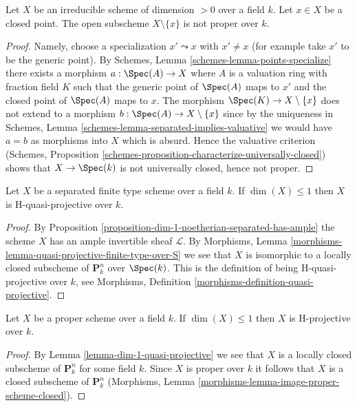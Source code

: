 \begin{lemma}
\label{lemma-proper-minus-point}
Let $X$ be an irreducible scheme of dimension $> 0$ over a field $k$.
Let $x \in X$ be a closed point. The open subscheme $X \setminus \{x\}$
is not proper over $k$.
\end{lemma}

\begin{proof}
Namely, choose a specialization $x' \leadsto x$ with $x' \not = x$
(for example take $x'$ to be the generic point). By
Schemes, Lemma \ref{schemes-lemma-points-specialize}
there exists a morphism $a : \Spec(A) \to X$
where $A$ is a valuation ring with fraction field $K$
such that the generic point of $\Spec(A)$
maps to $x'$ and the closed point of $\Spec(A)$ maps to $x$.
The morphism $\Spec(K) \to X \setminus \{x\}$ does
not extend to a morphism $b : \Spec(A) \to X \setminus \{x\}$
since by the uniqueness in Schemes, Lemma
\ref{schemes-lemma-separated-implies-valuative}
we would have $a = b$ as morphisms into $X$ which is absurd.
Hence the valuative criterion
(Schemes, Proposition
\ref{schemes-proposition-characterize-universally-closed})
shows that $X \to \Spec(k)$ is not universally closed, hence not proper.
\end{proof}

\begin{lemma}
\label{lemma-dim-1-quasi-projective}
Let $X$ be a separated finite type scheme over a field $k$.
If $\dim(X) \leq 1$ then $X$ is H-quasi-projective over $k$.
\end{lemma}

\begin{proof}
By Proposition \ref{proposition-dim-1-noetherian-separated-has-ample}
the scheme $X$ has an ample invertible sheaf $\mathcal{L}$.
By Morphisms, Lemma \ref{morphisms-lemma-quasi-projective-finite-type-over-S}
we see that $X$ is isomorphic to a locally
closed subscheme of $\mathbf{P}^n_k$ over $\Spec(k)$. This is
the definition of being H-quasi-projective over $k$, see
Morphisms, Definition \ref{morphisms-definition-quasi-projective}.
\end{proof}

\begin{lemma}
\label{lemma-dim-1-proper-projective}
Let $X$ be a proper scheme over a field $k$.
If $\dim(X) \leq 1$ then $X$ is H-projective over $k$.
\end{lemma}

\begin{proof}
By Lemma \ref{lemma-dim-1-quasi-projective} we see that $X$ is a
locally closed subscheme of $\mathbf{P}^n_k$ for some field $k$.
Since $X$ is proper over $k$ it follows that $X$ is a closed subscheme
of $\mathbf{P}^n_k$
(Morphisms, Lemma \ref{morphisms-lemma-image-proper-scheme-closed}).
\end{proof}

